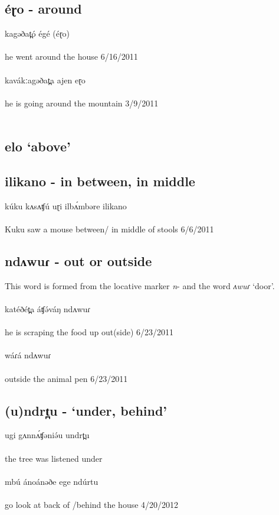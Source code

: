 \subsection{éɽo - around}
\gll kagəðat̪ó égé (éɽo)\\
\\
\trans	he went around the house		\hfill 6/16/2011\\
\\
\gll kavákːagəðat̪a ajen eɽo\\
\\
\trans he is going around the mountain	\hfill 3/9/2011\\
\\
\subsection{elo	‘above’}
\subsection{ilikano - in between, in middle}
\gll kúku kʌsʌʧú uɽi ilbʌ́mbəre ilikano\\
\\
\trans Kuku saw a mouse between/ in middle of stools		\hfill 6/6/2011\\

\subsection{ndʌwuɾ	-	out or outside}
This word is formed from the locative marker \textit{n}- and the word \textit{ʌwuɾ} ‘door’. \\
\\
\gll katéðét̪a áʧə́váŋ ndʌwuɾ\\
\\
\trans	he is scraping the food up out(side)	\hfill	6/23/2011\\
\\
\gll wáɾá ndʌwuɾ\\
\\
\trans	outside the animal pen		\hfill	6/23/2011\\

\subsection{(u)ndrt̪u	- ‘under, behind’}
\gll ugi gʌnnʌ́ʧəniə́u undrt̪u\\
\\
\trans	the tree was listened under	\\
\\
\gll mbú  ánoánəðe   ege ndúrtu\\
\\
\trans	go look at back of /behind the house	4/20/2012\\
\\
